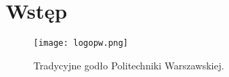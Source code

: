 \newpage %
\section[Wstęp]{Wstęp}
\lipsum[1] \cite{goossens93}
\begin{figure}[!h]
	\label{fig:anzelm}
	\centering \texttt{[image: logopw.png]}
	\caption{Tradycyjne godło Politechniki Warszawskiej.}
\end{figure}
\lipsum[2-10]

